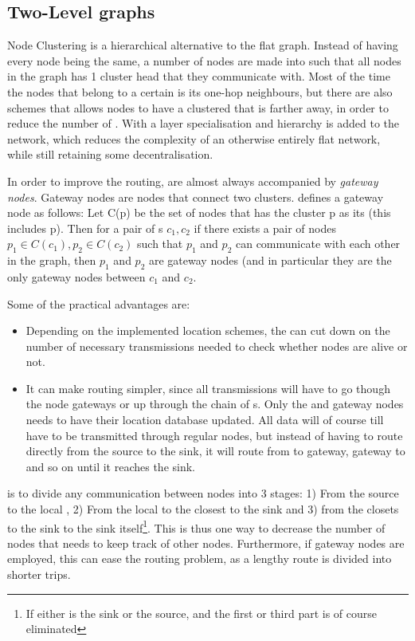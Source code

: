 \documentclass[letter, 12pt, english, draft]{article}
\begin{document}
\subsection{Two-Level graphs}
\label{cluster methods}
Node Clustering is a hierarchical alternative to the flat graph. Instead of having every node being the same, a number of nodes are made into \ch such that all nodes in the graph has 1 cluster head that they communicate with. Most of the time the nodes that belong to a certain \ch is its one-hop neighbours, but there are also schemes that allows nodes to have a clustered that is farther away, in order to reduce the number of \ch. With \ch a layer specialisation and hierarchy is added to the network, which reduces the complexity of an otherwise entirely flat network, while still retaining some decentralisation.

In order to improve the routing, \ch are almost always accompanied by \emph{gateway nodes}. Gateway nodes are nodes that connect two clusters. \cite{spanners} defines a gateway node as follows:
Let C(p) be the set of nodes that has the cluster p as its \ch (this includes p). Then for a pair of \ch s $c_1, c_2$ if there exists a pair of nodes $p_1 \in C(c_1), p_2 \in C(c_2)$ such that $p_1$ and $p_2$ can communicate with each other in the graph, then $p_1$ and $p_2$ are gateway nodes (and in particular they are the only gateway nodes between $c_1$ and $c_2$.  

Some of the practical advantages are:
\begin{itemize}
\item Depending on the implemented location schemes, the \ch can cut down on the number of necessary transmissions needed to check whether nodes are alive or not.
\item It can make routing simpler, since all transmissions will have to go though the node gateways or up through the chain of \ch s. Only the \ch and gateway nodes needs to have their location database updated. All data will of course till have to be transmitted through regular nodes, but instead of having to route directly from the source to the sink, it will route from \ch to gateway, gateway to \ch and so on until it reaches the sink.
\end{itemize}

\ch is to divide any communication between nodes into 3 stages: 1) From the source to the local \ch, 2) From the local \ch to the \ch closest to the sink and 3) from the \ch closets to the sink to the sink itself\footnote{If either \ch is the sink or the source, and the first or third part is of course eliminated}. This is thus one way to decrease the number of nodes that needs to keep track of other nodes. Furthermore, if gateway nodes are employed, this can ease the routing problem, as a lengthy route is divided into shorter trips.  
\end{document}
